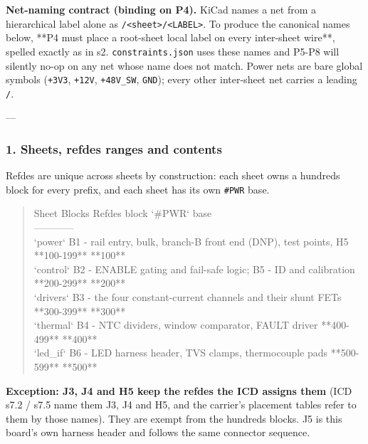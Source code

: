 \documentclass[11pt,a4paper]{article}
\begin{document}
\textbf{Net-naming contract (binding on P4).} KiCad names a net from a hierarchical label alone as \texttt{/\textless{}sheet\textgreater{}/\textless{}LABEL\textgreater{}}. To produce the canonical names below, {*}{*}P4 must place a root-sheet local label on every inter-sheet wire{*}{*}, spelled exactly as in s2. \texttt{constraints.json} uses these names and P5-P8 will silently no-op on any net whose name does not match. Power nets are bare global symbols (\texttt{+3V3}, \texttt{+12V}, \texttt{+48V\_SW}, \texttt{GND}); every other inter-sheet net carries a leading \texttt{/}.

---

\subsubsection*{1. Sheets, refdes ranges and contents}
Refdes are unique across sheets by construction: each sheet owns a hundreds block for every prefix, and each sheet has its own \texttt{\#PWR} base.

\begin{quote}\small\ttfamily\raggedright
\textbar{} Sheet \textbar{} Blocks \textbar{} Refdes block \textbar{} `\#PWR` base \textbar{}\\
\textbar{}---\textbar{}---\textbar{}---\textbar{}---\textbar{}\\
\textbar{} `power` \textbar{} B1 - rail entry, bulk, branch-B front end (DNP), test points, H5 \textbar{} {*}{*}100-199{*}{*} \textbar{} {*}{*}100{*}{*} \textbar{}\\
\textbar{} `control` \textbar{} B2 - ENABLE gating and fail-safe logic; B5 - ID and calibration \textbar{} {*}{*}200-299{*}{*} \textbar{} {*}{*}200{*}{*} \textbar{}\\
\textbar{} `drivers` \textbar{} B3 - the four constant-current channels and their shunt FETs \textbar{} {*}{*}300-399{*}{*} \textbar{} {*}{*}300{*}{*} \textbar{}\\
\textbar{} `thermal` \textbar{} B4 - NTC dividers, window comparator, FAULT driver \textbar{} {*}{*}400-499{*}{*} \textbar{} {*}{*}400{*}{*} \textbar{}\\
\textbar{} `led\_if` \textbar{} B6 - LED harness header, TVS clamps, thermocouple pads \textbar{} {*}{*}500-599{*}{*} \textbar{} {*}{*}500{*}{*} \textbar{}
\end{quote}
\textbf{Exception: J3, J4 and H5 keep the refdes the ICD assigns them} (ICD s7.2 / s7.5 name them J3, J4 and H5, and the carrier's placement tables refer to them by those names). They are exempt from the hundreds blocks. J5 is this board's own harness header and follows the same connector sequence.
\end{document}
